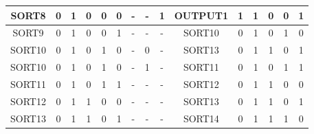 \begin{table}[H]
{\begin{tabular}{|cccccc|ccc|cccccc|}
  \multicolumn{1}{|c|}{SORT8}  & \multicolumn{1}{c|}{0}  & \multicolumn{1}{c|}{1}  & \multicolumn{1}{c|}{0}  & \multicolumn{1}{c|}{0}  & 0  & \multicolumn{1}{c|}{-}    & \multicolumn{1}{c|}{-}        & 1    & \multicolumn{1}{c|}{OUTPUT1} & \multicolumn{1}{c|}{1}  & \multicolumn{1}{c|}{1}  & \multicolumn{1}{c|}{0}  & \multicolumn{1}{c|}{0}  & 1  \\ \hline
  \multicolumn{1}{|c|}{SORT9}  & \multicolumn{1}{c|}{0}  & \multicolumn{1}{c|}{1}  & \multicolumn{1}{c|}{0}  & \multicolumn{1}{c|}{0}  & 1  & \multicolumn{1}{c|}{-}    & \multicolumn{1}{c|}{-}        & -    & \multicolumn{1}{c|}{SORT10}  & \multicolumn{1}{c|}{0}  & \multicolumn{1}{c|}{1}  & \multicolumn{1}{c|}{0}  & \multicolumn{1}{c|}{1}  & 0  \\ \hline
  \multicolumn{1}{|c|}{SORT10} & \multicolumn{1}{c|}{0}  & \multicolumn{1}{c|}{1}  & \multicolumn{1}{c|}{0}  & \multicolumn{1}{c|}{1}  & 0  & \multicolumn{1}{c|}{-}    & \multicolumn{1}{c|}{0}        & -    & \multicolumn{1}{c|}{SORT13}  & \multicolumn{1}{c|}{0}  & \multicolumn{1}{c|}{1}  & \multicolumn{1}{c|}{1}  & \multicolumn{1}{c|}{0}  & 1  \\ \hline
  \multicolumn{1}{|c|}{SORT10} & \multicolumn{1}{c|}{0}  & \multicolumn{1}{c|}{1}  & \multicolumn{1}{c|}{0}  & \multicolumn{1}{c|}{1}  & 0  & \multicolumn{1}{c|}{-}    & \multicolumn{1}{c|}{1}        & -    & \multicolumn{1}{c|}{SORT11}  & \multicolumn{1}{c|}{0}  & \multicolumn{1}{c|}{1}  & \multicolumn{1}{c|}{0}  & \multicolumn{1}{c|}{1}  & 1  \\ \hline
  \multicolumn{1}{|c|}{SORT11} & \multicolumn{1}{c|}{0}  & \multicolumn{1}{c|}{1}  & \multicolumn{1}{c|}{0}  & \multicolumn{1}{c|}{1}  & 1  & \multicolumn{1}{c|}{-}    & \multicolumn{1}{c|}{-}        & -    & \multicolumn{1}{c|}{SORT12}  & \multicolumn{1}{c|}{0}  & \multicolumn{1}{c|}{1}  & \multicolumn{1}{c|}{1}  & \multicolumn{1}{c|}{0}  & 0  \\ \hline
  \multicolumn{1}{|c|}{SORT12} & \multicolumn{1}{c|}{0}  & \multicolumn{1}{c|}{1}  & \multicolumn{1}{c|}{1}  & \multicolumn{1}{c|}{0}  & 0  & \multicolumn{1}{c|}{-}    & \multicolumn{1}{c|}{-}        & -    & \multicolumn{1}{c|}{SORT13}  & \multicolumn{1}{c|}{0}  & \multicolumn{1}{c|}{1}  & \multicolumn{1}{c|}{1}  & \multicolumn{1}{c|}{0}  & 1  \\ \hline
  \multicolumn{1}{|c|}{SORT13}  & \multicolumn{1}{c|}{0}  & \multicolumn{1}{c|}{1}  & \multicolumn{1}{c|}{1}  & \multicolumn{1}{c|}{0}  & 1  & \multicolumn{1}{c|}{-}    & \multicolumn{1}{c|}{-}        & -    & \multicolumn{1}{c|}{SORT14}  & \multicolumn{1}{c|}{0}  & \multicolumn{1}{c|}{1}  & \multicolumn{1}{c|}{1}  & \multicolumn{1}{c|}{1}  & 0  \\ \hline

\end{tabular}}
\end{table}
